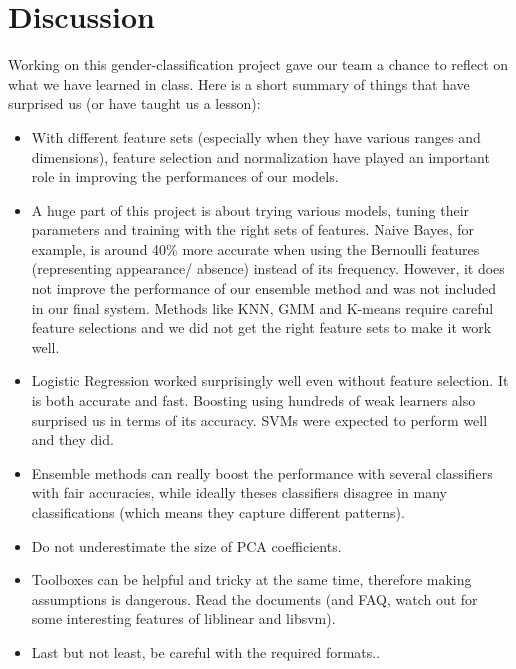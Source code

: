 \section{Discussion}
Working on this gender-classification project gave our team a chance to reflect on what we have learned in class. Here is a short summary of things that have surprised us (or have taught us a lesson):
\begin{itemize}
\item With different feature sets (especially when they have various ranges and dimensions), feature selection and normalization have played an important role in improving the performances of our models. 
\item A huge part of this project is about trying various models, tuning their parameters and training with the right sets of features. Naive Bayes, for example, is around 40\% more accurate when using the Bernoulli features (representing appearance/ absence) instead of its frequency. However, it does not improve the performance of our ensemble method and was not included in our final system. Methods like KNN, GMM and K-means require careful feature selections and we did not get the right feature sets to make it work well. 
\item Logistic Regression worked surprisingly well even without feature selection. It is both accurate and fast. Boosting using hundreds of weak learners also surprised us in terms of its accuracy. SVMs were expected to perform well and they did.
\item Ensemble methods can really boost the performance with several classifiers with fair accuracies, while ideally theses classifiers disagree in many classifications (which means they capture different patterns).
\item Do not underestimate the size of PCA coefficients. 
\item Toolboxes can be helpful and tricky at the same time, therefore making assumptions is dangerous. Read the documents (and FAQ, watch out for some interesting features of liblinear and libsvm).
\item Last but not least, be careful with the required formats..
\end{itemize} 

